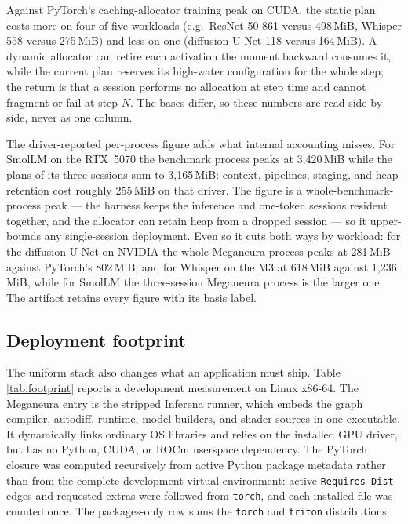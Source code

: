 \documentclass[10pt,twocolumn]{article}
\newcommand{\system}{Meganeura}
\newcommand{\inferena}{Inferena}
\newcommand{\code}[1]{\texttt{#1}}
\begin{document}
Against PyTorch's caching-allocator training peak on CUDA, the static plan
costs more on four of five workloads (e.g.\ ResNet-50 861 versus 498\,MiB,
Whisper 558 versus 275\,MiB) and less on one (diffusion U-Net 118 versus
164\,MiB). A dynamic allocator can retire each activation the moment backward
consumes it, while the current plan reserves its high-water configuration for
the whole step; the return is that a session performs no allocation at step
time and cannot fragment or fail at step $N$. The bases differ, so these
numbers are read side by side, never as one column.

The driver-reported per-process figure adds what internal accounting misses.
For SmolLM on the RTX~5070 the benchmark process peaks at 3{,}420\,MiB while
the plans of its three sessions sum to 3{,}165\,MiB: context, pipelines,
staging, and heap retention cost roughly 255\,MiB on that driver. The figure
is a whole-benchmark-process peak --- the harness keeps the inference and
one-token sessions resident together, and the allocator can retain heap from
a dropped session --- so it upper-bounds any single-session deployment. Even so it cuts
both ways by workload: for the diffusion U-Net on NVIDIA the whole \system{}
process peaks at 281\,MiB against PyTorch's 802\,MiB, and for Whisper on the
M3 at 618\,MiB against 1{,}236\,MiB, while for SmolLM the three-session
\system{} process is the larger one. The artifact retains every figure with
its basis label.

\subsection{Deployment footprint}
\label{sec:footprint}

The uniform stack also changes what an application must ship. Table
\ref{tab:footprint} reports a development measurement on Linux x86-64. The
\system{} entry is the stripped \inferena{} runner, which embeds the graph
compiler, autodiff, runtime, model builders, and shader sources in one
executable. It dynamically links ordinary OS libraries and relies on the
installed GPU driver, but has no Python, CUDA, or ROCm userspace dependency.
The PyTorch closure was computed recursively from active Python package
metadata rather than from the complete development virtual environment:
active \code{Requires-Dist} edges and requested extras were followed from
\code{torch}, and each installed file was counted once. The packages-only
row sums the \code{torch} and \code{triton} distributions.
\end{document}
